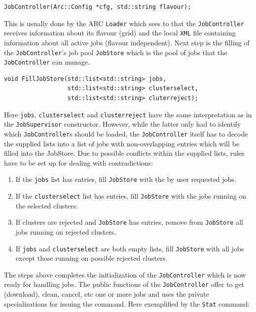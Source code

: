 \documentclass{book}
\newcommand{\JobSupervisor}{\texttt{JobSupervisor}}
\newcommand{\JobController}{\texttt{JobController}}
\newcommand{\XML}{\texttt{XML}}
\newcommand{\Loader}{\texttt{Loader}}
\begin{document}
\begin{shaded}
\begin{verbatim}
JobController(Arc::Config *cfg, std::string flavour);
\end{verbatim}
\end{shaded}

This is usually done by the ARC {\Loader} which sees to that the {\JobController} receives information about its flavour (grid) and 
the local {\XML} file containing information about all active jobs (flavour independent). Next step is the filling of the {\JobController}'s
job pool \texttt{JobStore} which is the pool of jobs that the {\JobController} can manage.

\begin{shaded}
\begin{verbatim}
void FillJobStore(std::list<std::string> jobs,
                  std::list<std::string> clusterselect,
                  std::list<std::string> cluterreject);
\end{verbatim}
\end{shaded}

Here \texttt{jobs}, \texttt{clusterselect} and \texttt{clusterreject} have the same interpretation as in the {\JobSupervisor} constructor. 
However, while the latter only had to identify which {\JobController}s should be loaded, the {\JobController} itself has to decode the 
supplied lists into a list of jobs with non-overlapping entries which will be filled into the JobStore. Due to possible conflicts 
within the supplied lists, rules have to be set up for dealing with contradictions:

\begin{enumerate}
\item{If the \texttt{jobs} list has entries, fill \texttt{JobStore} with the by user requested jobs.}
\item{If the \texttt{clusterselect} list has entries, fill \texttt{JobStore} with the jobs running on the selected clusters.}
\item{If clusters are rejected and \texttt{JobStore} has entries, remove from \texttt{JobStore} all jobs running on rejected clusters.}
\item{If \texttt{jobs} and \texttt{clusterselect} are both empty lists, fill \texttt{JobStore} with all jobs except those 
running on possible rejected clusters.}
\end{enumerate}

The steps above completes the initialization of the {\JobController} which is now ready for handling jobs. The public functions of the 
{\JobController} offer to get (download), clean, cancel, etc one or more jobs and uses the private specializations for issuing the command. 
Here exemplified by the \texttt{Stat} command:
\end{document}
